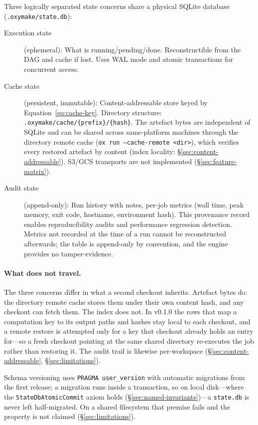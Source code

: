 \documentclass[12pt,a4paper]{article}
\newcommand{\code}[1]{{\texttt{\small\color{inlinecode}#1}}}
\begin{document}
Three logically separated state concerns share a physical SQLite database\linebreak
(\code{.oxymake/\allowbreak{}state.db}):

\begin{description}
\item[Execution state] (ephemeral): What is running/pending/done.
  Reconstructible from the DAG and cache if lost. Uses WAL mode and
  atomic transactions for concurrent access.

\item[Cache state] (persistent, immutable): Content-addressable store
  keyed by Equation~\ref{eq:cache-key}. Directory structure:
  \code{.oxymake/cache/\{prefix\}/\{hash\}}. The artefact bytes are
  independent of SQLite and can be shared across same-platform machines
  through the directory remote cache (\code{ox run --cache-remote
  <dir>}), which verifies every restored artefact by content
  (index locality: \S\ref{sec:content-addressable}). S3/GCS transports
  are not implemented (\S\ref{sec:feature-matrix}).

\item[Audit state] (append-only): Run history with notes, per-job metrics
  (wall time, peak memory, exit code, hostname, environment hash). This
  provenance record enables reproducibility audits and performance
  regression detection. Metrics not recorded at the time of a run
  cannot be reconstructed afterwards; the table is append-only by
  convention, and the engine provides no tamper-evidence.
\end{description}

\paragraph{What does not travel.}
The three concerns differ in what a second checkout inherits. Artefact
bytes do: the directory remote cache stores them under their own content
hash, and any checkout can fetch them. The index does not. In v0.1.0 the
rows that map a computation key to its output paths and hashes stay
local to each checkout, and a remote restore is attempted only for a key
that checkout already holds an entry for---so a fresh checkout pointing
at the same shared directory re-executes the job rather than restoring
it. The audit trail is likewise per-workspace
(\S\ref{sec:content-addressable}, \S\ref{sec:limitations}).

Schema versioning uses \code{PRAGMA user\_version} with automatic
migrations from the first release; a migration runs inside a
transaction, so on local disk---where the
\code{StateDbAtomicCommit} axiom holds (\S\ref{sec:named-invariants})---a
\code{state.db} is never left half-migrated. On a shared filesystem
that premise fails and the property is not claimed
(\S\ref{sec:limitations}).
\end{document}
